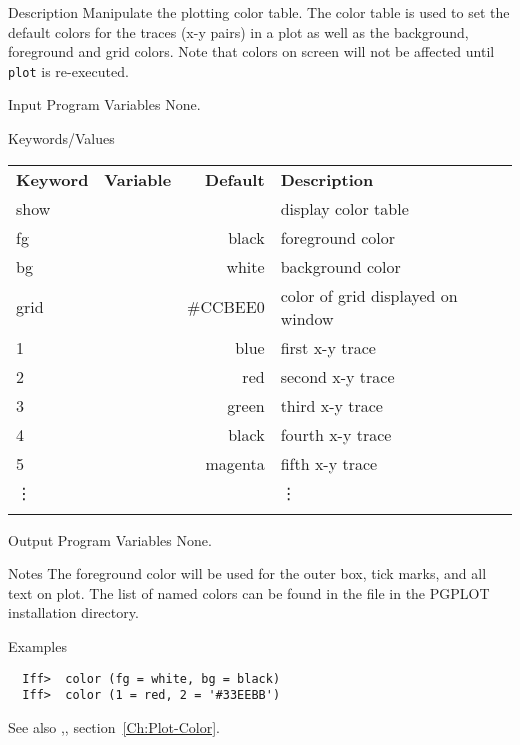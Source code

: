 \begin{IFFcom}
\item[Description] Manipulate the plotting color table.  The color table is
  used to set the default colors for the traces (x-y pairs) in a plot as
  well as the background, foreground and grid colors.  Note that colors on
  screen will not be affected until {\texttt{plot}} is re-executed.
\item[Input Program Variables] None.
\item[Keywords/Values] 
{\relax \hspace{0.25truein}\par\noindent\relax}
\begin{tabular}{llrl}
  \textbf{Keyword} & \textbf{Variable} & \textbf{Default} &
  \textbf{Description}\\
  \noalign{\smallskip}
  {show}    &  &          & display color table\\
  {fg}    &  & black    & foreground color\\
  {bg}    &  & white    & background color\\
  {grid}  &  & \#CCBEE0 & color of grid displayed on window\\
  1       &  & blue     & first x-y trace\\
  2       &  & red      & second x-y trace\\
  3       &  & green    & third x-y trace\\
  4       &  & black    & fourth x-y trace\\
  5       &  & magenta  & fifth x-y trace\\
  \vdots  &  &          & \vdots\\
  \noalign{\smallskip}
\end{tabular}
\noindent
 
\item[Output Program Variables] None.
\item[Notes] The foreground color will be used for the outer box, tick marks,
  and all text on plot.  The list of named colors can be found in the file
  {} in the PGPLOT installation directory.
\item[Examples] {\hspace{0.25truein} \vspace{-0.1truein} \relax }
\begin{verbatim} 
  Iff>  color (fg = white, bg = black)
  Iff>  color (1 = red, 2 = '#33EEBB')
\end{verbatim}
\item[See also] {},{},
  section~{\ref{Ch:Plot-Color}}. 
\end{IFFcom}

